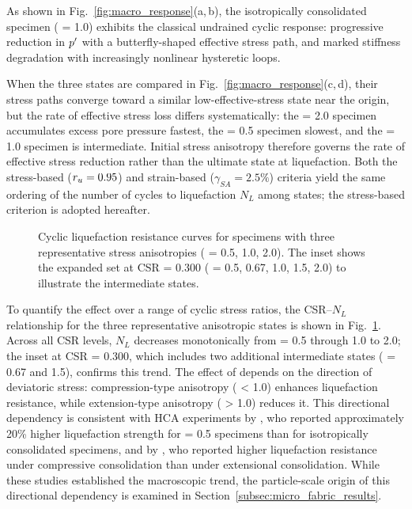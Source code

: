 As shown in Fig.~\ref{fig:macro_response}(a,\,b), the isotropically consolidated specimen (\Kzero{} = 1.0) exhibits the classical undrained cyclic response: progressive reduction in $p^\prime$ with a butterfly-shaped effective stress path, and marked stiffness degradation with increasingly nonlinear hysteretic loops.

When the three \Kzero{} states are compared in Fig.~\ref{fig:macro_response}(c,\,d), their stress paths converge toward a similar low-effective-stress state near the origin, but the rate of effective stress loss differs systematically: the \Kzero{} = 2.0 specimen accumulates excess pore pressure fastest, the \Kzero{} = 0.5 specimen slowest, and the \Kzero{} = 1.0 specimen is intermediate. Initial stress anisotropy therefore governs the rate of effective stress reduction rather than the ultimate state at liquefaction. Both the stress-based ($r_u = 0.95$) and strain-based ($\gamma_{SA} = 2.5\%$) criteria yield the same ordering of the number of cycles to liquefaction $N_L$ among \Kzero{} states; the stress-based criterion is adopted hereafter.

\begin{figure}[t]
  \centering
  \caption{Cyclic liquefaction resistance curves for specimens with three representative stress anisotropies (\Kzero{} = 0.5, 1.0, 2.0). The inset shows the expanded \Kzero{} set at CSR = 0.300 (\Kzero{} = 0.5, 0.67, 1.0, 1.5, 2.0) to illustrate the intermediate states.}
  \label{fig:liq_resistance_curves}
\end{figure}

To quantify the \Kzero{} effect over a range of cyclic stress ratios, the CSR--$N_L$ relationship for the three representative anisotropic states is shown in Fig.~\ref{fig:liq_resistance_curves}. Across all CSR levels, $N_L$ decreases monotonically from \Kzero{} = 0.5 through 1.0 to 2.0; the inset at CSR = 0.300, which includes two additional intermediate states (\Kzero{} = 0.67 and 1.5), confirms this trend. The effect of \Kzero{} depends on the direction of deviatoric stress: compression-type anisotropy (\Kzero{} < 1.0) enhances liquefaction resistance, while extension-type anisotropy (\Kzero{} > 1.0) reduces it. This directional dependency is consistent with HCA experiments by \citet{Vargas2020}, who reported approximately 20\% higher liquefaction strength for \Kzero{} = 0.5 specimens than for isotropically consolidated specimens, and by \citet{Zhao2024}, who reported higher liquefaction resistance under compressive consolidation than under extensional consolidation. While these studies established the macroscopic trend, the particle-scale origin of this directional dependency is examined in Section~\ref{subsec:micro_fabric_results}.

